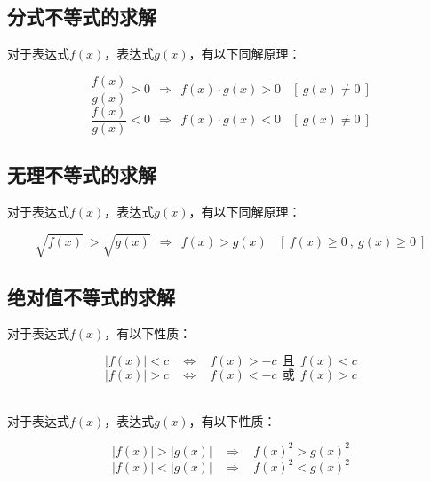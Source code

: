 \documentclass[UTF8]{ctexart}
\begin{document}
\subsection{分式不等式的求解}
    对于表达式$f(x)$，表达式$g(x)$，有以下同解原理：\\[1mm]
    \begin{large}
        \begin{equation*}
            \frac{f(x)}{g(x)}>0~~\Rightarrow~~f(x)\cdot g(x)>0~~~~\left[~g(x)\neq 0~\right]
        \end{equation*}\vspace{5pt}
        \begin{equation*}
            \frac{f(x)}{g(x)}<0~~\Rightarrow~~f(x)\cdot g(x)<0~~~~\left[~g(x)\neq 0~\right]
        \end{equation*}
    \end{large}\vspace{10pt}

\subsection{无理不等式的求解}
    对于表达式$f(x)$，表达式$g(x)$，有以下同解原理：\\[1mm]
    \begin{large}
        \begin{equation*}
            \sqrt{f(x)}~>\sqrt{g(x)}~~\Rightarrow~~f(x)>g(x)~~~~\left[~f(x)\ge 0~,~g(x)\ge 0~\right]
        \end{equation*}
    \end{large}

\newpage

\subsection{绝对值不等式的求解}
    对于表达式$f(x)$，有以下性质：
    \begin{large}
        \begin{equation*}
            \left|f(x)\right|<c~~~~\Leftrightarrow~~~~f(x)>-c~~\text{且}~~f(x)<c
        \end{equation*}
        \begin{equation*}
            \left|f(x)\right|>c~~~~\Leftrightarrow~~~~f(x)<-c~~\text{或}~~f(x)>c
        \end{equation*}
    \end{large}\\
    对于表达式$f(x)$，表达式$g(x)$，有以下性质：
    \begin{large}
        \begin{equation*}
            \left|f(x)\right|>\left|g(x)\right|~~~~\Rightarrow~~~~f(x)^2>g(x)^2
        \end{equation*}
        \begin{equation*}
            \left|f(x)\right|<\left|g(x)\right|~~~~\Rightarrow~~~~f(x)^2<g(x)^2
        \end{equation*}
    \end{large}
\end{document}
